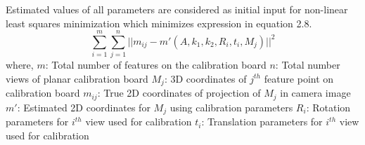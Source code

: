 \noindent  
Estimated values of all parameters are considered as initial input for non-linear least squares minimization which minimizes expression in equation 2.8.  
\begin{equation}  
\sum_{i=1}^{m}\sum_{j=1}^{n}||m_{ij}-m'(A,k_1,k_2,R_i,t_i,M_j)||^2  
\end{equation}\newline  
\noindent  
where,\newline  
$m$: Total number of features on the calibration board \newline  
$n$: Total number views of planar calibration board \newline  
$M_j$: 3D coordinates of $j^{th}$ feature point on calibration board\newline  
$m_{ij}$: True 2D coordinates of projection of $M_j$ in camera image\newline   
$m'$: Estimated 2D coordinates for $M_j$ using calibration parameters\newline  
$R_i$: Rotation parameters for $i^{th}$ view used for calibration\newline  
$t_i$: Translation parameters for $i^{th}$ view used for calibration\newline  
  
